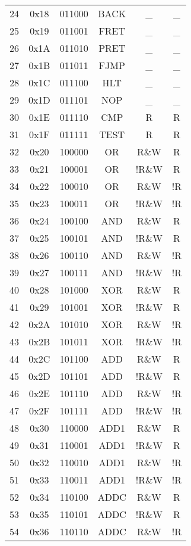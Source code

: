 \documentclass[oneside, a4paper]{memoir}
\begin{document}
\begin{center}
\begin{longtable}{cccccc}
24 & 0x18 & 011000 & BACK  & \_    & \_  \\
25 & 0x19 & 011001 & FRET  & \_    & \_  \\
26 & 0x1A & 011010 & PRET  & \_    & \_  \\
27 & 0x1B & 011011 & FJMP  & \_    & \_  \\
28 & 0x1C & 011100 & HLT   & \_    & \_  \\
29 & 0x1D & 011101 & NOP   & \_    & \_  \\
30 & 0x1E & 011110 & CMP   & R     & R   \\
31 & 0x1F & 011111 & TEST  & R     & R   \\
32 & 0x20 & 100000 & OR    & R\&W  & R   \\
33 & 0x21 & 100001 & OR    & !R\&W & R   \\
34 & 0x22 & 100010 & OR    & R\&W  & !R  \\
35 & 0x23 & 100011 & OR    & !R\&W & !R  \\
36 & 0x24 & 100100 & AND   & R\&W  & R   \\
37 & 0x25 & 100101 & AND   & !R\&W & R   \\
38 & 0x26 & 100110 & AND   & R\&W  & !R  \\
39 & 0x27 & 100111 & AND   & !R\&W & !R  \\
40 & 0x28 & 101000 & XOR   & R\&W  & R   \\
41 & 0x29 & 101001 & XOR   & !R\&W & R   \\
42 & 0x2A & 101010 & XOR   & R\&W  & !R  \\
43 & 0x2B & 101011 & XOR   & !R\&W & !R  \\
44 & 0x2C & 101100 & ADD   & R\&W  & R   \\
45 & 0x2D & 101101 & ADD   & !R\&W & R   \\
46 & 0x2E & 101110 & ADD   & R\&W  & !R  \\
47 & 0x2F & 101111 & ADD   & !R\&W & !R  \\
48 & 0x30 & 110000 & ADD1  & R\&W  & R   \\
49 & 0x31 & 110001 & ADD1  & !R\&W & R   \\
50 & 0x32 & 110010 & ADD1  & R\&W  & !R  \\
51 & 0x33 & 110011 & ADD1  & !R\&W & !R  \\
52 & 0x34 & 110100 & ADDC  & R\&W  & R   \\
53 & 0x35 & 110101 & ADDC  & !R\&W & R   \\
54 & 0x36 & 110110 & ADDC  & R\&W  & !R  \\

\end{longtable}
\end{center}
\end{document}
